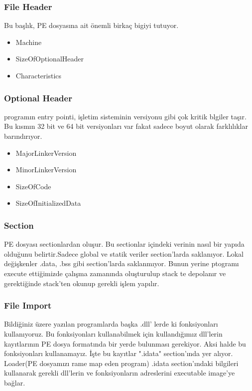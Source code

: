 \documentclass{article}
\begin{document}
\subsubsection{File Header}
Bu başlık, PE dosyasına ait önemli birkaç bigiyi tutuyor.
\begin{itemize}
    \item Machine
    \item SizeOfOptionalHeader
    \item Characteristics    
\end{itemize}

\subsubsection{Optional Header}
programın entry pointi, işletim sisteminin versiyonu gibi çok kritik blgiler taşır. Bu kısmın 32 bit ve 64 bit versiyonları var fakat sadece boyut olarak farklılıklar barındırıyor.
\begin{itemize}
    \item  MajorLinkerVersion
    \item MinorLinkerVersion
    \item SizeOfCode
    \item SizeOfInitializedData 
\end{itemize}

\subsubsection{Section}
PE dosyası sectionlardan oluşur. Bu sectionlar içindeki verinin nasıl bir yapıda olduğunu belirtir.Sadece global ve statik veriler section'larda saklanıyor. Lokal değişkenler .data, .bss gibi section'larda saklanmıyor. Bunun yerine ptogramı execute ettiğimizde çalışma zamanında oluşturulup stack te depolanır ve gerektiğinde stack'ten okunup gerekli işlem yapılır.

\subsubsection{File Import}
Bildiğiniz üzere yazılan programlarda başka .dll' lerde ki fonksiyonları kullanıyoruz. Bu fonksiyonları kullanabilmek için kullandığımız dll'lerin kayıtlarının PE dosya formatında bir yerde bulunması gerekiyor. Aksi halde bu fonksiyonları kullanamayız. İşte bu kayıtlar ".idata" section'ında yer alıyor. Loader(PE dosyamızı rame map eden program) .idata section'ındaki bilgileri kullanarak gerekli dll'lerin ve fonksiyonların adreslerini executable image'ye bağlar.
\end{document}
